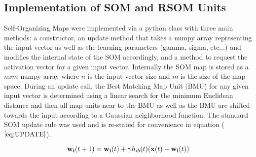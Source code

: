 \documentclass[a4paper,10pt]{article}
\begin{document}
\subsection{Implementation of SOM and RSOM Units}
Self-Organizing Maps were implemented via a python class with three main methods: a constructor,
an update method that takes a numpy array representing the input vector as well as the learning
parameters (gamma, sigma, etc...) and modifies the internal state of the SOM accordingly, and a
method to request the activation vector for a given input vector. Internally the SOM map is stored
as a $nxm$ numpy array where $n$ is the input vector size and $m$ is the size of the map space. 
During an update call, the Best Matching Map Unit (BMU) for any given input vector is determined
using a linear search for the minimum Euclidean distance and then all map units near to the BMU as
well as the BMU are shifted towards the input according to a Gaussian neighborhood function.  The
standard SOM update rule was used and is re-stated for convenience in equation ($\ref{eq:UPDATE}$).
 
\begin{equation} \label{eq:UPDATE}
 \bold{w_{i}}(t+1) = \bold{w_i}(t) + \gamma h_{ib}(t)(\bold{x}(t)-\bold{w_i}(t))
\end{equation}
\end{document}
